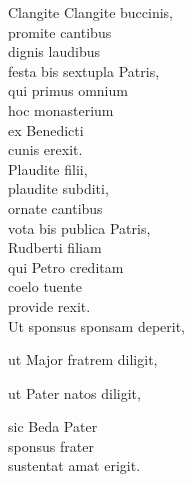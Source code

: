\documentclass[tocstyle=ref-genre]{ees}
\begin{document}
{\begin{movement}{Clangite}
  \voice[Coro]
  Clangite buccinis,\\
  promite cantibus\\
  dignis laudibus\\
  festa bis sextupla Patris,\\
  qui primus omnium\\
  hoc monasterium\\
  ex Benedicti\\
  cunis erexit.\\
  Plaudite filii,\\
  plaudite subditi,\\
  ornate cantibus\\
  vota bis publica Patris,\\
  Rudberti filiam\\
  qui Petro creditam\\
  coelo tuente\\
  provide rexit.\\

  Ut sponsus sponsam deperit,

  ut Major fratrem diligit,

  ut Pater natos diligit,

  \voice[Soli]
  sic Beda Pater\\
  sponsus frater\\
  sustentat amat erigit.
\end{movement}
}

\eesScore
\end{document}
